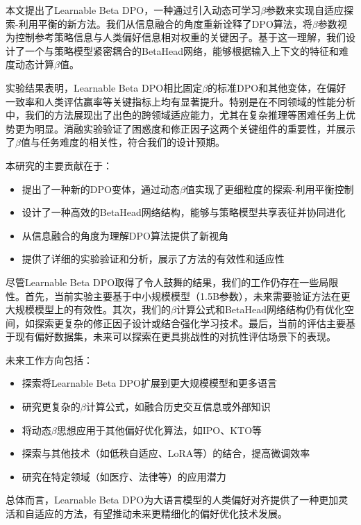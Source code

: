 本文提出了Learnable Beta DPO，一种通过引入动态可学习$\beta$参数来实现自适应探索-利用平衡的新方法。我们从信息融合的角度重新诠释了DPO算法，将$\beta$参数视为控制参考策略信息与人类偏好信息相对权重的关键因子。基于这一理解，我们设计了一个与策略模型紧密耦合的BetaHead网络，能够根据输入上下文的特征和难度动态计算$\beta$值。

实验结果表明，Learnable Beta DPO相比固定$\beta$的标准DPO和其他变体，在偏好一致率和人类评估赢率等关键指标上均有显著提升。特别是在不同领域的性能分析中，我们的方法展现出了出色的跨领域适应能力，尤其在复杂推理等困难任务上优势更为明显。消融实验验证了困惑度和修正因子这两个关键组件的重要性，并展示了$\beta$值与任务难度的相关性，符合我们的设计预期。

本研究的主要贡献在于：

\begin{itemize}
    \item 提出了一种新的DPO变体，通过动态$\beta$值实现了更细粒度的探索-利用平衡控制
    \item 设计了一种高效的BetaHead网络结构，能够与策略模型共享表征并协同进化
    \item 从信息融合的角度为理解DPO算法提供了新视角
    \item 提供了详细的实验验证和分析，展示了方法的有效性和适应性
\end{itemize}

尽管Learnable Beta DPO取得了令人鼓舞的结果，我们的工作仍存在一些局限性。首先，当前实验主要基于中小规模模型（1.5B参数），未来需要验证方法在更大规模模型上的有效性。其次，我们的$\beta$计算公式和BetaHead网络结构仍有优化空间，如探索更复杂的修正因子设计或结合强化学习技术。最后，当前的评估主要基于现有偏好数据集，未来可以探索在更具挑战性的对抗性评估场景下的表现。

未来工作方向包括：

\begin{itemize}
    \item 探索将Learnable Beta DPO扩展到更大规模模型和更多语言
    \item 研究更复杂的$\beta$计算公式，如融合历史交互信息或外部知识
    \item 将动态$\beta$思想应用于其他偏好优化算法，如IPO、KTO等
    \item 探索与其他技术（如低秩自适应、LoRA等）的结合，提高微调效率
    \item 研究在特定领域（如医疗、法律等）的应用潜力
\end{itemize}

总体而言，Learnable Beta DPO为大语言模型的人类偏好对齐提供了一种更加灵活和自适应的方法，有望推动未来更精细化的偏好优化技术发展。 